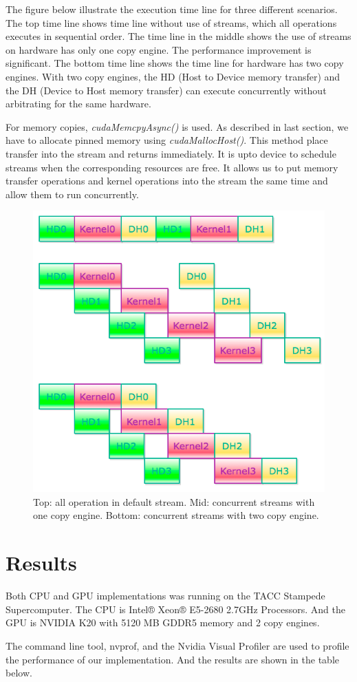\documentclass[journal,12pt,onecolumn,draftclsnofoot]{ieeeconf}  %
\begin{document}
The figure below illustrate the execution time line for three different scenarios. The top time line shows time line without use of streams, which all operations executes in sequential order. The time line in the middle shows the use of streams on hardware has only one copy engine. The performance improvement is significant. The bottom time line shows the time line for hardware has two copy engines. With two copy engines, the HD (Host to Device memory transfer) and the DH (Device to Host memory transfer) can execute concurrently without arbitrating for the same hardware. \par 
For memory copies, \textit{cudaMemcpyAsync()} is used. As described in last section, we have to allocate pinned memory using \textit{cudaMallocHost()}. This method place transfer into the stream and returns immediately. It is upto device to schedule streams when the corresponding resources are free. It allows us to put memory transfer operations and kernel operations into the stream the same time and allow them to run concurrently.\cite{Stream} \par
\begin{figure}[h]
	\centering\includegraphics[width=120mm]{concurrent.png}
	\caption{Top: all operation in default stream. Mid: concurrent streams with one copy engine. Bottom: concurrent streams with two copy engine.}
	\label{concurrent}
\end{figure}

\section{Results}
Both CPU and GPU implementations was running on the TACC Stampede Supercomputer. The CPU is Intel® Xeon® E5-2680 2.7GHz Processors. And the GPU is NVIDIA K20 with 5120 MB GDDR5 memory and 2 copy engines. \par
The command line tool, nvprof, and the Nvidia Visual Profiler are used to profile the performance of our implementation. And the results are shown in the table below.
\end{document}
